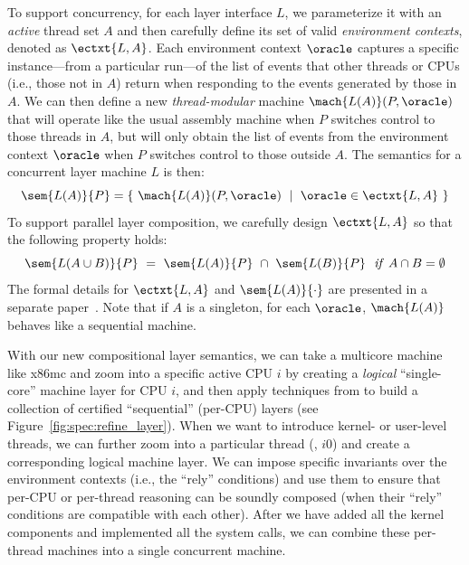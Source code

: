To support concurrency, for each layer interface $L$,
we parameterize it with an {\em active} thread set $A$ 
and then carefully define its set of valid {\em environment contexts},
denoted as $\ectxt{L,A}$. Each environment context $\oracle$ captures
a specific
instance---from a particular run---of the list of events that other
threads or CPUs (i.e., those not in $A$) return when responding
to the events generated by those in $A$.  We can then define a
new {\em thread-modular} machine $\mach{L(A)}(P,\oracle)$ that will
operate like the usual assembly machine when $P$ switches control to
those threads in $A$, but will only obtain the list of events from the
environment context $\oracle$ when $P$ switches control to those outside
$A$. The semantics for a concurrent layer machine $L$ is then:
\[
\sem{L(A)}{P} = \{ ~ \mach{L(A)}(P,\oracle) ~ \mid ~ \oracle \in \ectxt{L,A} ~ \}
\]%
\noindent{}To support parallel layer composition, 
we carefully design $\ectxt{L,A}$ so that the following
property holds:
\[
\sem{L(A\cup{}B)}{P} ~ = ~ \sem{L(A)}{P} ~ \cap ~ \sem{L(B)}{P} ~~ {\it if} ~ A\cap{}B=\emptyset
\]%
\noindent{}The formal details for $\ectxt{L,A}$ and 
$\sem{L(A)}{\cdot}$ are presented in a separate paper~\cite{ccal16}.
Note that if $A$ is a singleton, for each $\oracle$,
$\mach{L(A)}$  behaves like a sequential machine.

With our new compositional layer semantics, we can take a multicore
machine like x86mc and zoom into a specific active CPU $i$ by creating
a {\em logical} ``single-core'' machine layer for CPU $i$, and then
apply techniques from \citet{dscal15} to build a collection of
certified ``sequential'' (per-CPU) layers (see
Figure~\ref{fig:spec:refine_layer}).
When we want to introduce kernel- or
user-level threads, we can further zoom into a particular thread
(\eg, $i0$) and create a corresponding logical machine
layer.
We can impose
specific invariants over the environment contexts (i.e., the ``rely''
conditions) and use them to ensure that per-CPU or per-thread
reasoning can be soundly composed (when their ``rely'' conditions are
compatible with each other).
After we have added all the kernel components and
implemented all the system calls, we can combine these per-thread
machines into a single concurrent machine.

